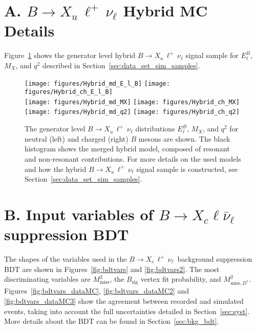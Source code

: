 \documentclass[twocolumn,aps,prd,superscriptaddress,nofootinbib,floatfix,preprintnumbers,a4]{revtex4-1}
\newcommand{\bulnu}{\ensuremath{B \to X_u \, \ell^+\, \nu_{\ell}}\xspace}
\newcommand{\bclnu}{\ensuremath{B \to X_c \, \ell^+\, \nu_{\ell}}\xspace}
\begin{document}
\begin{appendix}

\onecolumngrid

\section*{A. \bulnu Hybrid MC Details}

Figure~\ref{fig:hybridvars} shows the generator level hybrid \bulnu signal sample for $E_\ell^B$, $M_{X}$, and $q^2$ described in Section~\ref{sec:data_set_sim_samples}.


\begin{figure}[h!]
  \texttt{[image: figures/Hybrid\_md\_E\_l\_B]} 
  \texttt{[image: figures/Hybrid\_ch\_E\_l\_B]}  \\
  \texttt{[image: figures/Hybrid\_md\_MX]} 
  \texttt{[image: figures/Hybrid\_ch\_MX]}  \\
  \texttt{[image: figures/Hybrid\_md\_q2]} 
  \texttt{[image: figures/Hybrid\_ch\_q2]} 
\caption{
  The generator level \bulnu distributions $E_\ell^B$, $M_{X}$, and $q^2$ for neutral (left) and charged (right) $B$ mesons are shown. The black histogram shows the merged hybrid model, composed of resonant and non-resonant contributions. For more details on the used models and how the hybrid \bulnu signal sample is constructed, see Section~\ref{sec:data_set_sim_samples}.
 }
\label{fig:hybridvars}
\end{figure}  



\section*{B. Input variables of $B \to X_c \ell \bar \nu_\ell$ suppression BDT} \label{app:bdtvars}

The shapes of the variables used in the \bclnu\ background suppression BDT are shown in Figures~\ref{fig:bdtvars} and \ref{fig:bdtvars2}. The most discriminating variables are $M_{\mathrm{miss}}^2$, the $B_{\mathrm{sig}}$ vertex fit probability, and $M_{\mathrm{miss}, D^*}^2$. Figures~\ref{fig:bdtvars_dataMC}, \ref{fig:bdtvars_dataMC2} and \ref{fig:bdtvars_dataMC3} show the agreement between recorded and simulated events, taking into account the full uncertainties detailed in Section~\ref{sec:syst}. More details about the BDT can be found in Section~\ref{sec:bkg_bdt}. \vspace{4ex}



\end{appendix}
\end{document}

